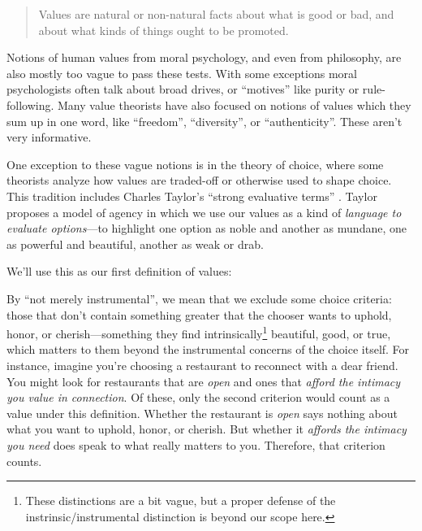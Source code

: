 \documentclass{article}
\theoremstyle{definition}
\newtheorem{definition}{Definition}[section]
\begin{document}
\begin{quote}
    Values are natural or non-natural facts about what is good or bad, and about what kinds of things ought to be promoted. \citep{Gabriel:2020}
\end{quote} 

Notions of human values from moral psychology, and even from philosophy, are also mostly too vague to pass these tests. With some exceptions \citep{Cushman2013,Morris2021} moral psychologists often talk about broad drives, or “motives'' like purity or rule-following. Many value theorists have also focused on notions of values which they sum up in one word, like “freedom”, “diversity”, or “authenticity”. These aren’t very informative.

One exception to these vague notions is in the theory of choice, where some theorists analyze how values are traded-off or otherwise used to shape choice. This tradition includes Charles Taylor’s “strong evaluative terms” \citep{Taylor1977}. Taylor proposes a model of agency in which we use our values as a kind of \textit{language to evaluate options}---to highlight one option as noble and another as mundane, one as powerful and beautiful, another as weak or drab. 

We'll use this as our first definition of values:


By “not merely instrumental”, we mean that we exclude some choice criteria: those that don’t contain something greater that the chooser wants to uphold, honor, or cherish—something they find intrinsically\footnote{These distinctions are a bit vague, but a proper defense of the instrinsic/instrumental distinction is beyond our scope here.} beautiful, good, or true, which matters to them beyond the instrumental concerns of the choice itself. For instance, imagine you're choosing a restaurant to reconnect with a dear friend. You might look for restaurants that are \textit{open} and ones that \textit{afford the intimacy you value in connection}. Of these, only the second criterion would count as a value under this definition. Whether the restaurant is \textit{open} says nothing about what you want to uphold, honor, or cherish. But whether it \textit{affords the intimacy you need} does speak to what really matters to you. Therefore, that criterion counts.
\end{document}
